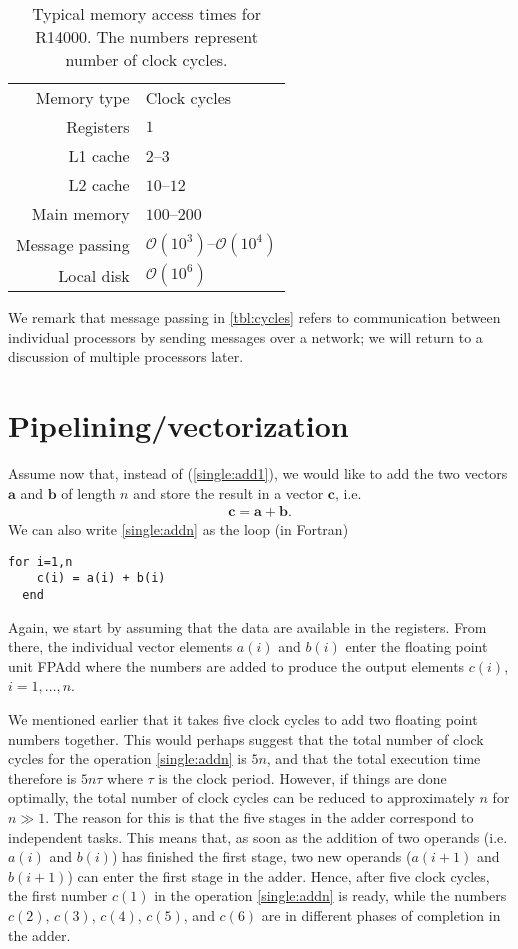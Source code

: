 \begin{table}
  \centering
  \caption{
    Typical memory access times for R14000. The numbers represent number of
    clock cycles.
  }
  \label{tbl:cycles}
  \bgroup{}
  \begin{tabular}{rl}
    \hline
    Memory type & Clock cycles \\ \hhline{==}
    Registers & $1$ \\ \hline
    L1 cache & $2$--$3$ \\ \hline
    L2 cache & $10$--$12$ \\ \hline
    Main memory &  $100$--$200$ \\ \hline
    Message passing & $\mathcal{O}(10^3)$--$\mathcal{O}(10^4)$ \\ \hline
    Local disk & $\mathcal{O}(10^6)$ \\ \hline
  \end{tabular}
  \egroup
\end{table}

We remark that message passing in \autoref{tbl:cycles} refers to communication
between individual processors by sending messages over a network; we will return
to a discussion of multiple processors later.

\section{Pipelining/vectorization}

Assume now that, instead of (\ref{single:add1}), we would like to add the two
vectors $\bm a$ and $\bm b$ of length $n$ and store the result in a vector $\bm
c$, i.e.
\begin{align}
  \bm c = \bm a + \bm b.
  \label{single:addn}
\end{align}
We can also write \eqref{single:addn} as the loop (in Fortran)
\begin{lstlisting}[style=fortran]
  for i=1,n
    c(i) = a(i) + b(i)
  end
\end{lstlisting}
Again, we start by assuming that the data are available in the registers. From
there, the individual vector elements $a(i)$ and $b(i)$ enter the floating point
unit FPAdd where the numbers are added to produce the output elements $c(i)$,
$i=1,\ldots,n$.

We mentioned earlier that it takes five clock cycles to add two floating point
numbers together. This would perhaps suggest that the total number of clock
cycles for the operation \eqref{single:addn} is $5n$, and that the total
execution time therefore is $5n\tau$ where $\tau$ is the clock period. However,
if things are done optimally, the total number of clock cycles can be reduced to
approximately $n$ for $n\gg 1$. The reason for this is that the five stages in
the adder correspond to independent tasks. This means that, as soon as the
addition of two operands (i.e. $a(i)$ and $b(i)$) has finished the first stage,
two new operands ($a(i+1)$ and $b(i+1)$) can enter the first stage in the adder.
Hence, after five clock cycles, the first number $c(1)$ in the operation
\eqref{single:addn} is ready, while the numbers $c(2)$, $c(3)$, $c(4)$, $c(5)$,
and $c(6)$ are in different phases of completion in the adder.

